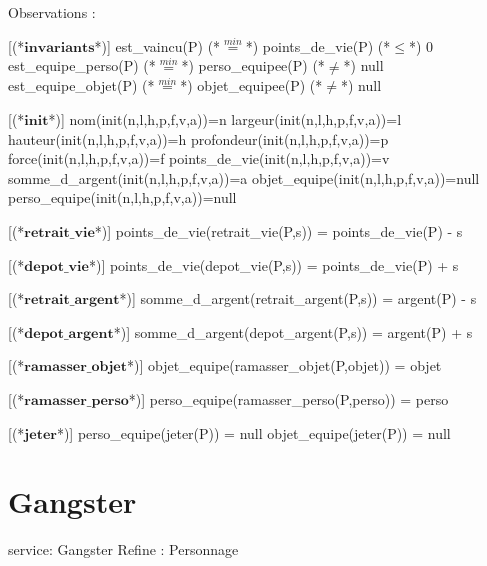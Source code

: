 \documentclass[a4paper, 11pt]{report}
\newcommand{\specB}[1]{\textbf{#1}}
\begin{document}
\begin{Spe}
Observations : 

	[(*$\specB{invariants}$*)]
		est_vaincu(P) (*$\stackrel{min}{=}$*) points_de_vie(P) (*$\le$*) 0
		est_equipe_perso(P) (*$\stackrel{min}{=}$*) perso_equipee(P) (*$\ne$*) null
		est_equipe_objet(P) (*$\stackrel{min}{=}$*) objet_equipee(P) (*$\ne$*) null
		
	[(*$\specB{init}$*)]
		nom(init(n,l,h,p,f,v,a))=n
		largeur(init(n,l,h,p,f,v,a))=l
		hauteur(init(n,l,h,p,f,v,a))=h
		profondeur(init(n,l,h,p,f,v,a))=p
		force(init(n,l,h,p,f,v,a))=f
		points_de_vie(init(n,l,h,p,f,v,a))=v
		somme_d_argent(init(n,l,h,p,f,v,a))=a
		objet_equipe(init(n,l,h,p,f,v,a))=null
		perso_equipe(init(n,l,h,p,f,v,a))=null
                
	[(*$\specB{retrait\_vie}$*)]
		points_de_vie(retrait_vie(P,s)) = points_de_vie(P) - s
		
	[(*$\specB{depot\_vie}$*)]
		points_de_vie(depot_vie(P,s)) = points_de_vie(P) + s 
		
	[(*$\specB{retrait\_argent}$*)]
		somme_d_argent(retrait_argent(P,s)) = argent(P) - s 
		
	[(*$\specB{depot\_argent}$*)]
		somme_d_argent(depot_argent(P,s)) = argent(P) + s 
		
	[(*$\specB{ramasser\_objet}$*)]
		objet_equipe(ramasser_objet(P,objet)) = objet 
		
	[(*$\specB{ramasser\_perso}$*)]
		perso_equipe(ramasser_perso(P,perso)) = perso 
		
	[(*$\specB{jeter}$*)]
		perso_equipe(jeter(P)) = null
		objet_equipe(jeter(P)) = null
\end{Spe}
\section{Gangster}
\begin{Spe}
service: Gangster
Refine : Personnage

 
\end{Spe}
\end{document}
